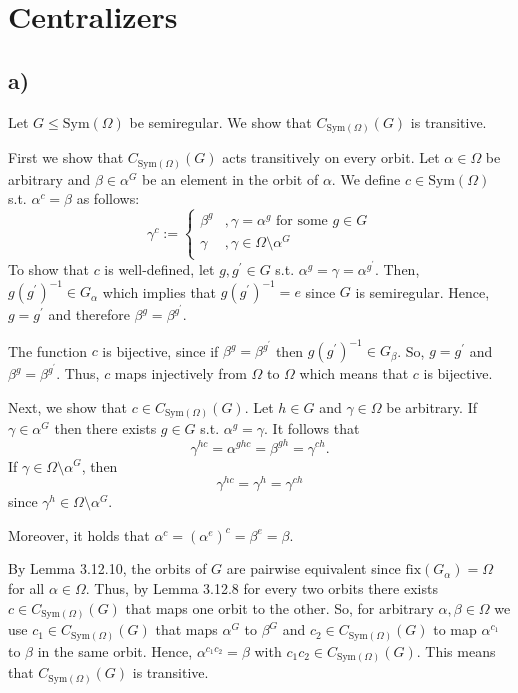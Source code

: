\section{Centralizers}
\subsection*{a)}
Let $G \leq \text{Sym}(\Omega)$ be semiregular. We show that $C_{\text{Sym}(\Omega)}(G)$ is transitive.

First we show that $C_{\text{Sym}(\Omega)}(G)$ acts transitively on every orbit. Let $\alpha \in \Omega$ be arbitrary and $\beta \in \alpha^G$ be an element in the orbit of $\alpha$. We define $c \in \text{Sym}(\Omega)$ s.t. $\alpha^c = \beta$ as follows:
\[ \gamma^c := 
	\begin{cases} 
      \beta^g &, \gamma = \alpha^g \text{ for some } g \in G \\
      \gamma &, \gamma \in \Omega \setminus \alpha^G \\
   \end{cases} \]
To show that $c$ is well-defined, let $g, g^\prime \in G$ s.t. $\alpha^g = \gamma = \alpha^{g^\prime}$. Then, $g (g^\prime)^{-1} \in G_\alpha$ which implies that $g (g^\prime)^{-1} = e$ since $G$ is semiregular. Hence, $g = g^\prime$ and therefore $\beta^g = \beta^{g^\prime}$.

The function $c$ is bijective, since if $\beta^g = \beta^{g^\prime}$ then $g (g^\prime)^{-1} \in G_\beta$. So, $g = g^\prime$ and $\beta^g = \beta^{g^\prime}$. Thus, $c$ maps injectively from $\Omega$ to $\Omega$ which means that $c$ is bijective.

Next, we show that $c \in C_{\text{Sym}(\Omega)}(G)$. Let $h \in G$ and $\gamma \in \Omega$ be arbitrary. If $\gamma \in \alpha^G$ then there exists $g \in G$ s.t. $\alpha^g = \gamma$. It follows that
\[ \gamma^{hc} = \alpha^{ghc} = \beta^{gh} = \gamma^{ch}. \]
If $\gamma \in \Omega \setminus \alpha^G$, then
\[ \gamma^{hc} = \gamma^h = \gamma^{ch} \]
since $\gamma^h \in \Omega \setminus \alpha^G$.

Moreover, it holds that $\alpha^c = (\alpha^e)^c = \beta^e = \beta$.

By Lemma 3.12.10, the orbits of $G$ are pairwise equivalent since $\text{fix}(G_\alpha) = \Omega$ for all $\alpha \in \Omega$. Thus, by Lemma 3.12.8 for every two orbits there exists $c \in C_{\text{Sym}(\Omega)}(G)$ that maps one orbit to the other. So, for arbitrary $\alpha, \beta \in \Omega$ we use $c_1 \in C_{\text{Sym}(\Omega)}(G)$ that maps $\alpha^G$ to $\beta^G$ and $c_2 \in C_{\text{Sym}(\Omega)}(G)$ to map $\alpha^{c_1}$ to $\beta$ in the same orbit. Hence, $\alpha^{c_1 c_2} = \beta$ with $c_1 c_2 \in C_{\text{Sym}(\Omega)}(G)$. This means that $C_{\text{Sym}(\Omega)}(G)$ is transitive.

